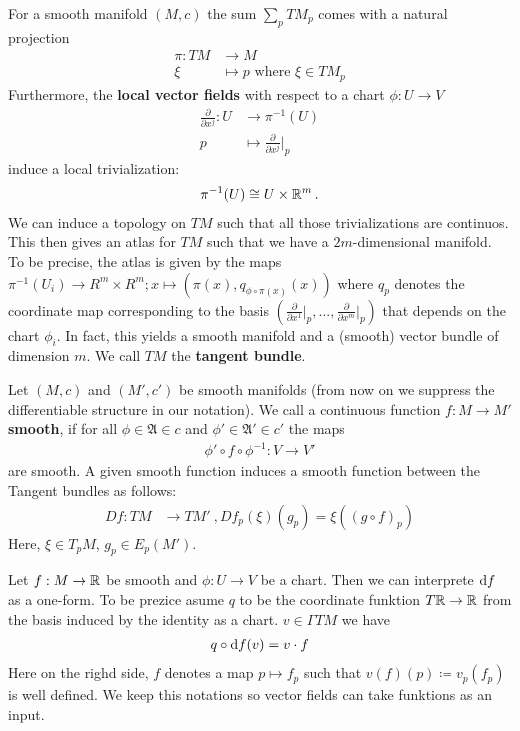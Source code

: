 \begin{definition}
    For a smooth manifold $(M,c)$ the sum $\sum_pTM_p$ comes with a natural projection 
    \begin{align*}
        \pi: TM &\to M \\
        \xi &\mapsto p \text{ where }\xi \in TM_p 
    \end{align*} Furthermore, the \textbf{local vector fields} with respect to a chart $\phi:U\to V$
    \begin{align*}
        \frac{\partial}{\partial x^j}: U & \to \pi^{-1}(U) \\
        p &\mapsto \frac{\partial}{\partial x^j}\Big|_p
    \end{align*} induce a local trivialization:
    \begin{align*}
        \pi^{-1}(U)\cong U \times \mathbb{R}^m\, .
    \end{align*} We can induce a topology on $TM$ such that all those trivializations are continuos. This then gives an atlas for $TM$ such that we have a $2m$-dimensional manifold. To be precise, the atlas is given by the maps $\pi^{-1}(U_i)\to R^m\times R^m; x\mapsto (\pi(x),q_{\phi\circ \pi(x)}(x))$ where $q_p$ denotes the coordinate map corresponding to the basis $(\frac{\partial}{\partial x^1}\big|_p,...,\frac{\partial}{\partial x^m}\big|_p)$ that depends on the chart $\phi_i$.  In fact, this yields a smooth manifold and a (smooth) vector bundle of dimension $m$. We call $TM$ the \textbf{tangent bundle}.
\end{definition}
\begin{definition}
    Let $(M,c)$ and $(M',c')$ be smooth manifolds (from now on we suppress the differentiable structure in our notation). We call a continuous function $f:M \to M'$ \textbf{smooth}, if for all $\phi\in \mathfrak{A}\in c$ and $\phi'\in \mathfrak{A}'\in c'$ the maps
    \begin{align*}
        \phi'\circ f\circ  \phi^{-1}:V\to V'
    \end{align*} are smooth. A given smooth function induces a smooth function between the Tangent bundles as follows:
    \begin{align*}
        Df: TM &\to TM' ~,Df_p(\xi)(g_p)=\xi((g\circ f)_p)
    \end{align*}Here, $\xi\in T_pM$, $g_p\in E_p(M')$.
\end{definition}
\begin{corollary}
	Let $f:M\to \mathbb{R}$ be smooth and $\phi: U\to V$ be a chart. Then we can interprete $\mathop{}\!\mathrm{d} f$ as a one-form. To be prezice asume $q$ to be the coordinate funktion $T\mathbb{R}\to \mathbb{R}$ from the basis induced by the identity as a chart. $v\in \Gamma TM$ we have
	\begin{align*}
		 q\circ \mathop{}\!\mathrm{d} f(v)=v\cdot f
	\end{align*} Here on the righd side, $f$ denotes a map $p\mapsto f_p$ such that $v(f)(p)\coloneq v_p(f_p)$ is well defined. We keep this notations so vector fields can take funktions as an input.
\end{corollary}
